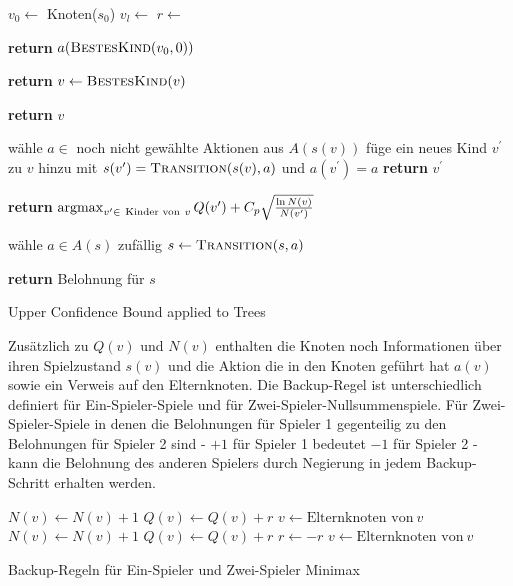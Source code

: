 \begin{algorithm}[H]
\begin{algorithmic}[1]
	\State $v_0\gets$ Knoten($s_0$)
		\State $v_l\gets$ 
		\State $r\gets$ 
		\State {}
	\EndWhile 
	
\State \textbf{return} $a(\Call{BestesKind}{v_0,0})$
\EndFunction

			\State \textbf{return} 
		\Else
			\State $v \gets \textsc{BestesKind}(v)$
		\EndIf
	\EndWhile
	 
	\State \textbf{return} $v$
\EndFunction

	\State wähle $a \in$ noch nicht gewählte Aktionen aus $A(s(v))$
	\State füge ein neues Kind $v^\prime$ zu $v$ hinzu
	\State mit $s(v^\prime) = \textsc{Transition}(s(v),a)$
		\State und $a(v^\prime) = a$
		\State \textbf{return} $v^\prime$
\EndFunction

\State \textbf{return} $\operatorname*{argmax}_{v^\prime \in\ \text{Kinder von}\ v} Q(v^\prime) + C_p \sqrt{\frac{\ln N(v)}{N(v^\prime)}}$
\EndFunction

\State wähle $a \in A(s)$ zufällig
\State $s \gets \textsc{Transition}(s,a)$
\EndWhile

\State \textbf{return} Belohnung für $s$
\EndFunction
\end{algorithmic}
\caption{Upper Confidence Bound applied to Trees\footnotemark}
\label{algo:UCT}
\end{algorithm}

Zusätzlich zu $Q(v)$ und $N(v)$ enthalten die Knoten noch Informationen über ihren Spielzustand $s(v)$ und die Aktion die in den Knoten geführt hat $a(v)$ sowie ein Verweis auf den Elternknoten. Die Backup-Regel ist unterschiedlich definiert für Ein-Spieler-Spiele und für Zwei-Spieler-Nullsummenspiele. Für Zwei-Spieler-Spiele in denen die Belohnungen für Spieler 1 gegenteilig zu den Belohnungen für Spieler 2 sind - $+1$ für Spieler 1 bedeutet $-1$ für Spieler 2 - kann die Belohnung des anderen Spielers durch Negierung in jedem Backup-Schritt erhalten werden.


\begin{algorithm}[H]
\begin{algorithmic}		
 
		\State $N(v) \gets N(v) + 1$
		\State $Q(v) \gets Q(v) + r$
		\State $v \gets \text{Elternknoten von}\ v$
	\EndWhile
\EndFunction\\

 
		\State $N(v) \gets N(v) + 1$
		\State $Q(v) \gets Q(v) + r$
		\State $r \gets -r$
		\State $v \gets \text{Elternknoten von}\ v$
	\EndWhile
\EndFunction
\end{algorithmic}
\caption{Backup-Regeln für Ein-Spieler und Zwei-Spieler Minimax}
\end{algorithm}

